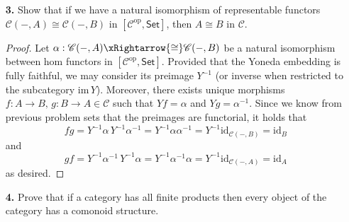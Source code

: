 \documentclass[ 12pt ]{article}
\begin{document}
\begin{enumerate}
	\item[\textbf{3.}] Show that if we have a natural isomorphism of representable functors $\mathscr{C}(-, A) \cong \mathscr{C}(-, B)$ in $[\mathscr{C}^\mathrm{op}, \mathsf{Set}]$, then $A \cong B$ in $\mathscr{C}$.

		\begin{proof}
			Let $\alpha : \mathscr{C}(-, A) \xRightarrow{\cong} \mathscr{C}(-, B)$ be a natural isomorphism between hom functors in $[\mathscr{C}^\mathrm{op}, \mathsf{Set}]$. Provided that the Yoneda embedding is fully faithful, we may consider its preimage $Y^{-1}$ (or inverse when restricted to the subcategory $\mathrm{im}\, Y$). Moreover, there exists unique morphisms $f : A \to B,\, g : B \to A \in \mathscr{C}$ such that $Yf = \alpha$ and $Yg = \alpha^{-1}$. Since we know from previous problem sets that the preimages are functorial, it holds that $$fg = Y^{-1} \alpha\, Y^{-1} \alpha^{-1} = Y^{-1} \alpha \alpha^{-1} = Y^{-1} \mathrm{id}_{\mathscr{C}(-, B)} = \mathrm{id}_B$$ and $$gf = Y^{-1} \alpha^{-1}\, Y^{-1} \alpha = Y^{-1} \alpha^{-1} \alpha = Y^{-1} \mathrm{id}_{\mathscr{C}(-, A)} = \mathrm{id}_A$$ as desired.
		\end{proof}


	\item[\textbf{4.}] Prove that if a category has all finite products then every object of the category has a comonoid structure.


\end{enumerate}
\end{document}
